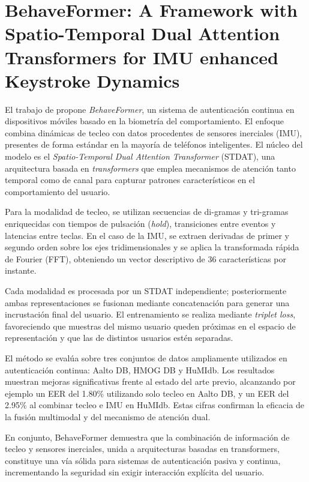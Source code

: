 \section{BehaveFormer: A Framework with Spatio-Temporal Dual Attention
Transformers for IMU enhanced Keystroke Dynamics}


El trabajo de \cite{senerath2023} propone \textit{BehaveFormer}, un sistema de autenticación continua en dispositivos móviles basado en la biometría del comportamiento. El enfoque combina dinámicas de tecleo con datos procedentes de sensores inerciales (IMU), presentes de forma estándar en la mayoría de teléfonos inteligentes. El núcleo del modelo es el \textit{Spatio-Temporal Dual Attention Transformer} (STDAT), una arquitectura basada en \textit{transformers} que emplea mecanismos de atención tanto temporal como de canal para capturar patrones característicos en el comportamiento del usuario.

Para la modalidad de tecleo, se utilizan secuencias de di-gramas y tri-gramas enriquecidas con tiempos de pulsación (\textit{hold}), transiciones entre eventos y latencias entre teclas. En el caso de la IMU, se extraen derivadas de primer y segundo orden sobre los ejes tridimensionales y se aplica la transformada rápida de Fourier (FFT), obteniendo un vector descriptivo de 36 características por instante.

Cada modalidad es procesada por un STDAT independiente; posteriormente ambas representaciones se fusionan mediante concatenación para generar una incrustación final del usuario. El entrenamiento se realiza mediante \textit{triplet loss}, favoreciendo que muestras del mismo usuario queden próximas en el espacio de representación y que las de distintos usuarios estén separadas.

El método se evalúa sobre tres conjuntos de datos ampliamente utilizados en autenticación continua: Aalto DB, HMOG DB y HuMIdb. Los resultados muestran mejoras significativas frente al estado del arte previo, alcanzando por ejemplo un EER del 1.80\% utilizando solo tecleo en Aalto DB, y un EER del 2.95\% al combinar tecleo e IMU en HuMIdb. Estas cifras confirman la eficacia de la fusión multimodal y del mecanismo de atención dual.

En conjunto, BehaveFormer demuestra que la combinación de información de tecleo y sensores inerciales, unida a arquitecturas basadas en transformers, constituye una vía sólida para sistemas de autenticación pasiva y continua, incrementando la seguridad sin exigir interacción explícita del usuario.

